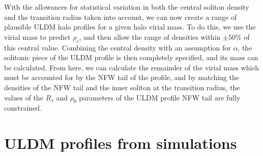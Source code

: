 \documentclass[a4paper,11pt]{article}
\begin{document}
With the allowances for statistical variation in both the central soliton density and the transition radius taken into account, we can now create a range of plausible ULDM halo profiles for a given halo virial mass. To do this, we use the virial mass to predict $\rho_c$, and then allow the range of densities within $\pm 50\% $ of this central value. Combining the central density with an assumption for $\alpha$, the solitonic piece of the ULDM profile is then completely specified, and its mass can be calculated. From here, we can calculate the remainder of the virial mass which must be accounted for by the NFW tail of the profile, and by matching the densities of the NFW tail and the inner soliton at the transition radius, the values of the $R_s$ and $\rho_0$ parameters of the ULDM profile NFW tail are fully constrained.  



\section{ULDM profiles from simulations}\label{sec:sim_comparison}
\end{document}
